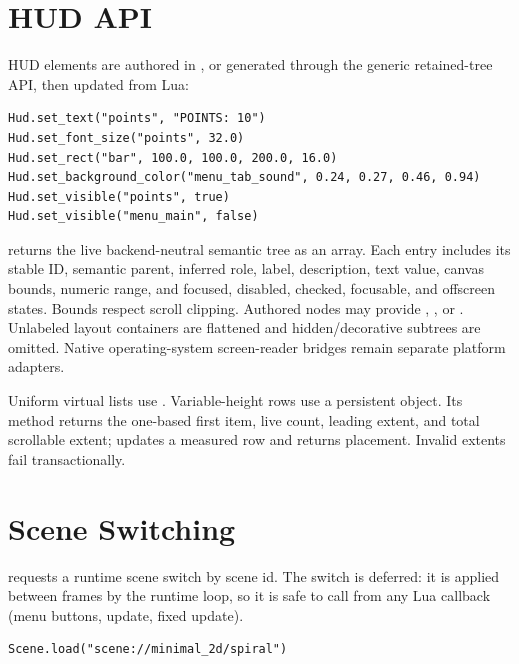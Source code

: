 \section{HUD API}

HUD elements are authored in , or generated through the
generic retained-tree API, then updated from Lua:

\begin{lstlisting}[language={[5.2]Lua}]
Hud.set_text("points", "POINTS: 10")
Hud.set_font_size("points", 32.0)
Hud.set_rect("bar", 100.0, 100.0, 200.0, 16.0)
Hud.set_background_color("menu_tab_sound", 0.24, 0.27, 0.46, 0.94)
Hud.set_visible("points", true)
Hud.set_visible("menu_main", false)
\end{lstlisting}

 returns the live backend-neutral semantic
tree as an array. Each entry includes its stable ID, semantic parent, inferred
role, label, description, text value, canvas bounds, numeric range, and
focused, disabled, checked, focusable, and offscreen states. Bounds respect
scroll clipping. Authored nodes may provide
, , or
. Unlabeled layout containers are flattened and
hidden/decorative subtrees are omitted. Native operating-system screen-reader
bridges remain separate platform adapters.

Uniform virtual lists use
. Variable-height rows use a persistent
 object. Its
 method returns the one-based first item, live count,
leading extent, and total scrollable extent;  updates a
measured row and  returns placement. Invalid extents fail
transactionally.

\section{Scene Switching}

 requests a runtime scene switch by scene id. The switch is deferred: it is applied between frames by the runtime loop, so it is safe to call from any Lua callback (menu buttons, update, fixed update).

\begin{lstlisting}[language={[5.2]Lua}]
Scene.load("scene://minimal_2d/spiral")
\end{lstlisting}

